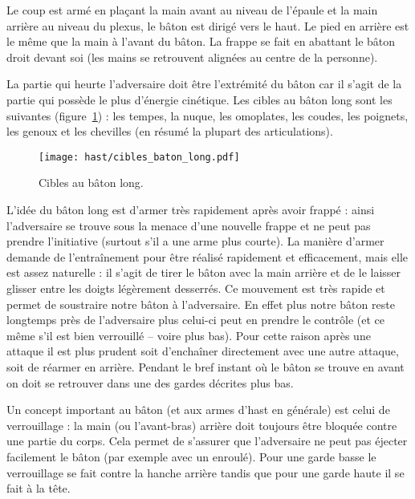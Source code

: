 \begin{coup}

Le coup est armé en plaçant la main avant au niveau de l'épaule et la main arrière au niveau du plexus, le bâton est dirigé vers le haut.
Le pied en arrière est le même que la main à l'avant du bâton.
La frappe se fait en abattant le bâton droit devant soi (les mains se retrouvent alignées au centre de la personne).
\end{coup}


La partie qui heurte l'adversaire doit être l'extrémité du bâton car il s'agit de la partie qui possède le plus d'énergie cinétique.
Les cibles au bâton long sont les suivantes (figure~\ref{baton:fig:cibles}) : les tempes, la nuque, les omoplates, les coudes, les poignets, les genoux et les chevilles (en résumé la plupart des articulations).


\begin{figure}[ht]
	\centering
	\texttt{[image: hast/cibles\_baton\_long.pdf]}
	\caption{Cibles au bâton long.}
	\label{baton:fig:cibles}
\end{figure}


L'idée du bâton long est d'armer très rapidement après avoir frappé : ainsi l'adversaire se trouve sous la menace d'une nouvelle frappe et ne peut pas prendre l'initiative (surtout s'il a une arme plus courte).
La manière d'armer demande de l'entraînement pour être réalisé rapidement et efficacement, mais elle est assez naturelle : il s'agit de tirer le bâton avec la main arrière et de le laisser glisser entre les doigts légèrement desserrés.
Ce mouvement est très rapide et permet de soustraire notre bâton à l'adversaire.
En effet plus notre bâton reste longtemps près de l'adversaire plus celui-ci peut en prendre le contrôle (et ce même s'il est bien verrouillé -- voire plus bas).
Pour cette raison après une attaque il est plus prudent soit d'enchaîner directement avec une autre attaque, soit de réarmer en arrière.
Pendant le bref instant où le bâton se trouve en avant on doit se retrouver dans une des gardes décrites plus bas.



Un concept important au bâton (et aux armes d'hast en générale) est celui de verrouillage : la main (ou l'avant-bras) arrière doit toujours être bloquée contre une partie du corps.
Cela permet de s'assurer que l'adversaire ne peut pas éjecter facilement le bâton (par exemple avec un enroulé).
Pour une garde basse le verrouillage se fait contre la hanche arrière tandis que pour une garde haute il se fait à la tête.


